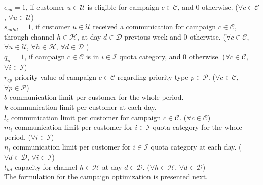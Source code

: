 \documentclass[11pt]{article}
\begin{document}
\noindent $e_{{c}{u}}=1$, if customer $u \in \mathcal{U}$ is eligible for campaign $c \in \mathcal{C}$, and 0 otherwise.
($\forall c \in \mathcal{C}$, $\forall u \in \mathcal{U}$)\\

\noindent $s_{{c}{u}{h}{d}}=1$, if customer $u \in \mathcal{U}$ received a communication for campaign $c \in \mathcal{C}$, through channel $h \in \mathcal{H}$, at day $d \in \mathcal{D}$ previous week and 0 otherwise.
($\forall c \in \mathcal{C}$, $\forall u \in \mathcal{U}$, $\forall h \in \mathcal{H}$, $\forall d \in \mathcal{D}$ )\\

\noindent $q_{{i}{c}}=1$, if campaign $c \in \mathcal{C}$ is in $i \in \mathcal{I}$ quota category, and 0 otherwise.
($\forall c \in \mathcal{C}$, $\forall i \in \mathcal{I}$)\\

\noindent $r_{{c}{p}}$ priority value of campaign $c \in \mathcal{C}$ regarding priority type $p \in \mathcal{P}$.
($\forall c \in \mathcal{C}$, $\forall p \in \mathcal{P}$)\\

\noindent $b$ communication limit per customer for the whole period.\\

\noindent $k$ communication limit per customer at each day.\\

\noindent $l_{c}$ communication limit per customer for campaign $c \in \mathcal{C}$.
($\forall c \in \mathcal{C}$)\\

\noindent $m_{i}$ communication limit per customer for $i \in \mathcal{I}$ quota category for the whole period.
($\forall i \in \mathcal{I}$)\\

\noindent $n_{i}$ communication limit per customer for $i \in \mathcal{I}$ quota category at each day.
($\forall d \in \mathcal{D}$, $\forall i \in \mathcal{I}$)\\

\noindent $t_{{h}{d}}$ capacity for channel $h \in \mathcal{H}$ at day $d \in \mathcal{D}$.
($\forall h \in \mathcal{H}$, $\forall d \in \mathcal{D}$)\\

\noindent The formulation for the campaign optimization is presented next.
\end{document}
